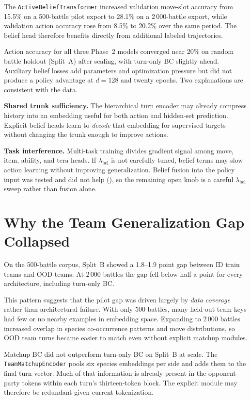 The \texttt{ActiveBeliefTransformer} increased validation move-slot accuracy from
15.5\% on a 500-battle pilot export to 28.1\% on a 2\,000-battle export, while
validation action accuracy rose from 8.5\% to 20.2\% over the same period. The
belief head therefore benefits directly from additional labeled trajectories.

Action accuracy for all three Phase~2 models converged near 20\% on random battle
holdout (Split~A) after scaling, with turn-only BC slightly ahead. Auxiliary
belief losses add parameters and optimization pressure but did not produce a
policy advantage at $d=128$ and twenty epochs. Two explanations are consistent
with the data.

\textbf{Shared trunk sufficiency.} The hierarchical turn encoder may already
compress history into an embedding useful for both action and hidden-set
prediction. Explicit belief heads learn to \emph{decode} that embedding for
supervised targets without changing the trunk enough to improve actions.

\textbf{Task interference.} Multi-task training divides gradient signal among
move, item, ability, and tera heads. If $\lambda_\mathrm{bel}$ is not carefully
tuned, belief terms may slow action learning without improving generalization.
Belief fusion into the policy input was tested and did not help
(), so the remaining open knob is a careful $\lambda_\mathrm{bel}$
sweep rather than fusion alone.

\section{Why the Team Generalization Gap Collapsed}

On the 500-battle corpus, Split~B showed a 1.8--1.9 point gap between ID train
teams and OOD teams. At 2\,000 battles the gap fell below half a point for every
architecture, including turn-only BC.

This pattern suggests that the pilot gap was driven largely by \emph{data
coverage} rather than architectural failure. With only 500 battles, many
held-out team keys had few or no nearby examples in embedding space. Expanding
to 2\,000 battles increased overlap in species co-occurrence patterns and move
distributions, so OOD team turns became easier to match even without explicit
matchup modules.

Matchup BC did not outperform turn-only BC on Split~B at scale. The
\texttt{TeamMatchupEncoder} pools six species embeddings per side and adds them
to the final turn vector. Much of that information is already present in the
opponent party tokens within each turn's thirteen-token block. The explicit
module may therefore be redundant given current tokenization.

